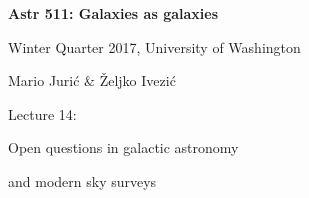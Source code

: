 \documentclass[letterpaper,landscape]{slides}
\begin{document}

\begin{slide}

\phantom{x}
\vskip -2in
\begin{center}
\bfseries
{\large {\color{blue} Astr 511: Galaxies as galaxies}}
\end{center}

{\centerline {{\color{blue} 
Winter Quarter 2017, University of Washington}}}
{\centerline {{\color{blue} 
Mario Juri\'{c} \& \v{Z}eljko Ivezi\'{c} }}}

\vskip 1.6in

{\centerline {\huge {\color{red}      Lecture 14:             }}}
\vskip 0.2in 
{\centerline {\Large {\color{blue} Open questions in galactic astronomy }}}
{\centerline {\Large {\color{blue} and modern sky surveys }}}

\vfill
\end{slide}
\end{document}
